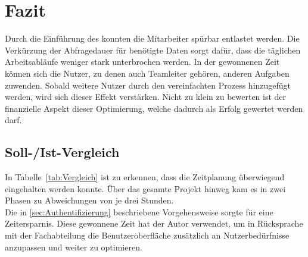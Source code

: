 \section{Fazit} 
\label{sec:Fazit}
Durch die Einführung des  konnten die Mitarbeiter spürbar entlastet werden.
Die Verkürzung der Abfragedauer für benötigte Daten sorgt dafür, dass die täglichen Arbeitsabläufe weniger
stark unterbrochen werden. In der gewonnenen Zeit können sich die Nutzer, zu denen auch
Teamleiter gehören, anderen Aufgaben zuwenden. Sobald weitere Nutzer durch den vereinfachten
Prozess hinzugefügt werden, wird sich dieser Effekt verstärken. Nicht zu klein zu bewerten
ist der finanzielle Aspekt dieser Optimierung, welche dadurch als Erfolg gewertet werden darf. 

\subsection{Soll-/Ist-Vergleich}
\label{sec:SollIstVergleich}
In Tabelle~\ref{tab:Vergleich} ist zu erkennen, dass die Zeitplanung überwiegend eingehalten werden konnte.
Über das gesamte Projekt hinweg kam es in zwei Phasen zu Abweichungen von je drei Stunden.\\
Die in \ref{sec:Authentifizierung}  beschriebene Vorgehensweise sorgte für eine Zeitersparnis.
Diese gewonnene Zeit hat der Autor verwendet, um in Rücksprache mit der Fachabteilung die Benutzeroberfläche zusätzlich an
Nutzerbedürfnisse anzupassen und weiter zu optimieren.

